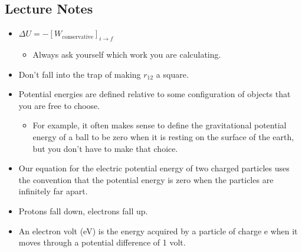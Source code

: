 \documentclass[11pt]{article}
\begin{document}
\subsection{Lecture Notes}
\begin{itemize}
    \item $\Delta U = - [W_\text{conservative}] _{i \rightarrow f}$
    \begin{itemize}
        \item Always ask yourself which work you are calculating.
    \end{itemize}

    \item Don't fall into the trap of making $r_{1 2}$ a square.
    \item Potential energies are defined relative to some configuration of objects that you are free to choose.
    \begin{itemize}
        \item For example, it often makes sense to define the gravitational potential energy of a ball to be zero when it is resting on the surface of the earth, but you don’t have to make that choice.
    \end{itemize}

    \item Our equation for the electric potential energy of two charged particles uses the convention that the potential energy is zero when the particles are infinitely far apart.
    \item Protons fall down, electrons fall up.
    \item An electron volt (eV) is the energy acquired by a particle of charge e when it moves through a potential difference of 1 volt.
\end{itemize}
\end{document}
